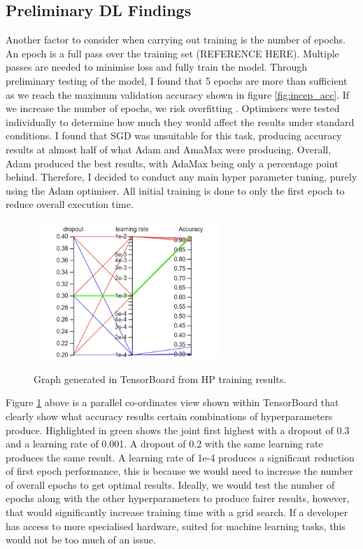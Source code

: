 \documentclass[12pt,a4paper]{report}
\begin{document}
\subsection{Preliminary DL Findings}

Another factor to consider when carrying out training is the number of epochs. An epoch is a full pass over the training
set (REFERENCE HERE). Multiple passes are needed to minimise loss and fully train the model. Through preliminary testing of the model, 
I found that 5 epochs are more than sufficient as we reach the maximum validation accuracy shown in figure 
\ref{fig:incep_acc}. If we 
increase the number of epochs, we risk overfitting \citep{geeksforgeeks}. Optimisers were tested individually to 
determine how much they would affect the results under standard conditions. I found that SGD was unsuitable for this 
task, producing accuracy results at almost half of what Adam and AmaMax were producing. Overall, Adam produced the best 
results, with AdaMax being only a percentage point behind. Therefore, I decided to conduct any main hyper parameter 
tuning, purely using the Adam optimiser. All initial training is done to only the first epoch to reduce overall 
execution time. 

\begin{figure}[h]\
    \centering
    \includegraphics[width=0.6\textwidth]{cross_graph.png}
    \caption{Graph generated in TensorBoard from HP training results.}
    \label{fig:cross}
\end{figure}

\break

Figure \ref{fig:cross} above is a parallel co-ordinates view shown within TensorBoard that clearly show what accuracy 
results 
certain combinations of hyperparameters produce. Highlighted in green shows the joint first highest with a dropout of 
0.3 and a learning rate of 0.001. A dropout of 0.2 with the same learning rate produces the same result. A learning rate
of 1e-4 produces a significant reduction of first epoch performance, this is because we would need to increase the 
number of overall epochs to get optimal results. Ideally, we would test the number of epochs along with the other 
hyperparameters to produce fairer results, however, that would significantly increase training time with a grid search. 
If a developer has access to more specialised hardware, suited for machine learning tasks, this would not be too much of
an issue.
\end{document}
